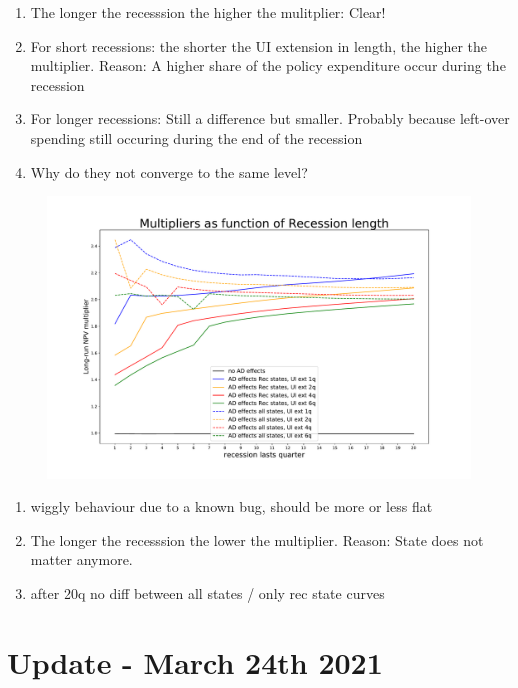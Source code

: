 \documentclass[]{article}
\begin{document}
\begin{enumerate}
	\item The longer the recesssion the higher the mulitplier: Clear!
	\item For short recessions: the shorter the UI extension in length, the higher the multiplier. Reason: A higher share of the policy expenditure occur during the recession
	\item For longer recessions: Still a difference but smaller. Probably because left-over spending still occuring during the end of the recession
	\item Why do they not converge to the same level?
\end{enumerate}

\begin{figure}[h]
	\centering
	\includegraphics[width=1\linewidth]{../FullRun_Apr04_AD05_AllStates/Multipliers_RecLength_PolicyLength2}
	\caption{}
	\label{fig:multipliersreclengthpolicylength2}
\end{figure}

\begin{enumerate}
	\item wiggly behaviour due to a known bug, should be more or less flat
	\item The longer the recesssion the lower the multiplier. Reason: State does not matter anymore. 
	\item after 20q no diff between all states / only rec state curves
\end{enumerate}



\newpage
\FloatBarrier	
\section{Update - March 24th 2021}
\end{document}
